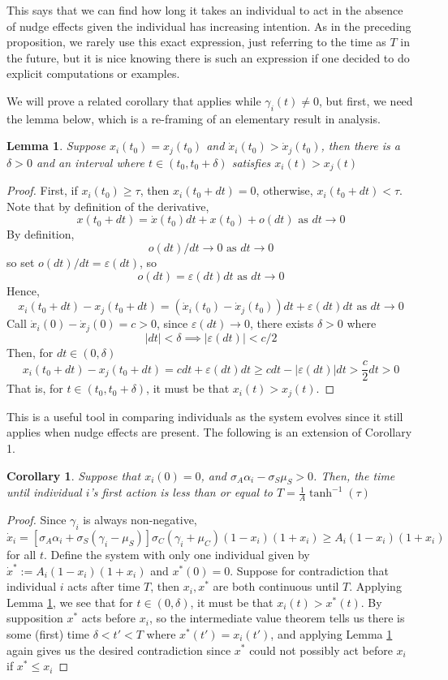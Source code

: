 \documentclass[preprint,12pt]{elsarticle}
\newcommand{\eps}{\varepsilon}
\newtheorem{lemma}{Lemma}
\newtheorem{cor}{Corollary}
\begin{document}
This says that we can find how long it takes an individual to act in the absence of nudge effects given the individual has increasing intention. As in the preceding proposition, we rarely use this exact expression, just referring to the time as $T$ in the future, but it is nice knowing there is such an expression if one decided to do explicit computations or examples.

We will prove a related corollary that applies while $\gamma_i(t) \neq 0$, but first, we need the lemma below, which is a re-framing of an elementary result in analysis.
\begin{lemma}\label{LEMMA:derivativeDef}
    Suppose $x_i(t_0) = x_j(t_0)$ and $\dot x_i(t_0) > \dot x_j(t_0)$, then there is a $\delta > 0$ and an interval where $t \in (t_0, t_0 + \delta)$ satisfies $x_i(t) > x_j(t)$
\end{lemma}
\begin{proof} First, if $x_i(t_0)  \geq \tau$, then $x_i(t_0 + dt) = 0$, otherwise, $x_i(t_0 + dt) < \tau$. Note that by definition of the derivative,
\[
x(t_0 + dt) = \dot x(t_0)dt + x(t_0) + o(dt) \text{ as } dt \to 0
\]
By definition,
\[
o(dt)/dt \to 0 \text{ as } dt \to 0
\]
so set $o(dt)/dt = \eps(dt)$, so  \[
o(dt) = \eps(dt)dt \text{ as } dt \to 0
\]
Hence, \[
x_i(t_0 + dt) - x_j(t_0 + dt) = (\dot x_i(t_0) - \dot x_j(t_0)) dt + \eps(dt) dt \text{ as } dt \to 0
\]
Call $\dot x_i(0) - \dot x_j(0) = c > 0$, since $\eps(dt) \to 0$, there exists $\delta > 0$ where\[
|dt| < \delta \implies |\eps(dt)| < c/2
\]
Then, for $dt \in (0,\delta)$\[
x_i(t_0  +dt) - x_j(t_0 + dt) = c dt +  \eps(dt)dt \geq c dt -  |\eps(dt)|dt > \frac{c}{2}dt > 0
\]
That is, for $t \in (t_0, t_0+ \delta)$, it must be that $x_i(t) > x_j(t)$. \end{proof}
This is a useful tool in comparing individuals as the system evolves since it still applies when nudge effects are present. The following is an extension of Corollary 1.

\begin{cor}\label{periodBound}
Suppose that $x_i(0) = 0$, and $\sigma_A\alpha_i - \sigma_S\mu_S > 0$. Then, the time until individual $i$'s first action is less than or equal to $T = \frac{1}{A}\tanh^{-1}(\tau)$
\end{cor}
\begin{proof} Since $\gamma_i$ is always non-negative, \[
\dot x_i = [\sigma_A \alpha_i + \sigma_S(\gamma_i - \mu_S)]\sigma_C (\gamma_i + \mu_C)(1-x_i)(1+x_i) \geq A_i(1-x_i)(1+x_i)
\]
for all $t$. Define the system with only one individual given by $\dot x^* := A_i(1-x_i)(1+x_i)$ and $x^*(0) = 0$. Suppose for contradiction that individual $i$ acts after time $T$, then $x_i, x^*$ are both continuous until $T$. Applying Lemma \ref{LEMMA:derivativeDef}, we see that for $t \in (0, \delta)$, it must be that $x_i(t) > x^*(t)$. By supposition $x^*$ acts before $x_i$, so the intermediate value theorem tells us there is some (first) time $\delta < t' < T$ where $x^*(t') = x_i(t')$, and applying Lemma \ref{LEMMA:derivativeDef} again gives us the desired contradiction since $x^*$ could not possibly act before $x_i$ if $x^* \leq x_i$ \end{proof}
\end{document}
